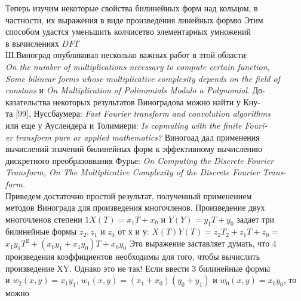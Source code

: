 \documentclass{mai_book}
\begin{document}
{	\noindent Теперь изучим некоторые свойства билинейных форм над кольцом, в \\ частности, их выражения в виде произведения линейных формю Этим \\ способом удастся уменьшить колчисетво элементарных умножений \\ в вычислениях $DFT$\\
	\indent Ш.Виноград опубликовал несколько важных работ в этой области:\\ \textit{On the number of multiplications necessary to compute certain function, \\ Some bilinear forms whose multiplicative complesity depends on the field of \\ constans} и \textit{On Multiplication of Polinomials Modulo a Polynomial}. До-\\казательства некоторых результатов Виноградова можно найти у Кну-\\та [99], Нуссбаумера: \textit{Fast Fourier transform and convolution algorithms}\\ или еще у Ауслендера и Толимиери: \textit{Is copmuting with the finite Fouri-\\er transform pure or applied mathematics?} Виногоад дал применения \\ вычислений значений билинейных форм к эффективному вычислению \\ дискретного преобразоввания Фурье: \textit{On Computing the Discrete Fourier \\ Transform, On The Multiplicative Complexity of the Discrete Fourier Trans-\\form.}\\
	\indent Приведем достаточно простой результат, полученный применением \\
	методов Винограда для произведения многочленов. Произведение двух \\
	многочленов степени $1 X(T) = x_1T + x_0$ и $Y(Y) = y_1T+y_0$ задает три \\
	билинейные формы $z_2, z_1$ и $z_0$ от  $х$ и $у$: $X(T)Y(T) = z_2T_2 + z_1T + z_0 =$\\$ x_1y_1T^2 + (x_0y_1+x_1y_0)T + x_0y_0$  Это выражение заставляет думать, что $4$\\ 
	произведения коэффициентов необходимы для того, чтобы вычислить \\
	произведение XY. Однако это не так! Если ввести $3$ билинейные формы \\
	и $w_2(x,y) = x_1y_1$, $w_1(x,y) = (x_1 + x_0)(y_0 + y_1)$ и $w_0(x,y) = x_0y_0$, то можно \\
}
\end{document}
